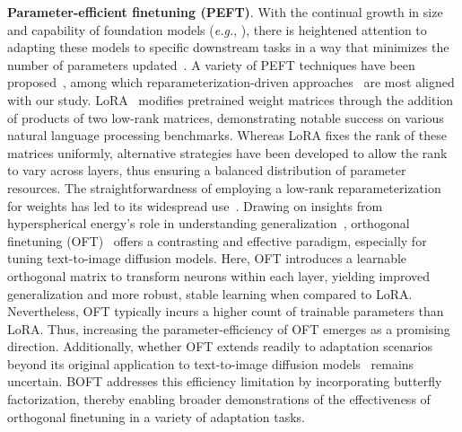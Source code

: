 \textbf{Parameter-efficient finetuning (PEFT)}. With the continual growth in size and capability of foundation models (\emph{e.g.}, \cite{brown2020language,radford2021learning,rombach2022high,kirillov2023segment}), there is heightened attention to adapting these models to specific downstream tasks in a way that minimizes the number of parameters updated~\cite{treviso2023efficient,ding2023parameter,lialin2023scaling}. A variety of PEFT techniques have been proposed~\cite{houlsby2019parameter,aghajanyan2020intrinsic,hulora2022,edalati2022krona,wang2022adamix,gheini2021cross,zaken2022bitfit,guo2020parameter,sung2021training,ansell2022composable,lester2021power,li2021prefix,vu2022spot,he2021towards,mao2021unipelt,karimi2021compacter,liu2022few,sung2022lst,chen2022parameter,jia2022visual,chen2022adaptformer,zhang2022neural,jie2023fact,lian2022scaling,luo2023towards}, among which reparameterization-driven approaches~\cite{aghajanyan2020intrinsic,hulora2022,edalati2022krona} are most aligned with our study. LoRA~\cite{hulora2022} modifies pretrained weight matrices through the addition of products of two low-rank matrices, demonstrating notable success on various natural language processing benchmarks. Whereas LoRA fixes the rank of these matrices uniformly, alternative strategies \cite{zhang2022adaptive,valipour2022dylora,zhang2023increlora} have been developed to allow the rank to vary across layers, thus ensuring a balanced distribution of parameter resources. The straightforwardness of employing a low-rank reparameterization for weights has led to its widespread use~\cite{dettmers2023qlora,zi2023delta,chavan2023one}. Drawing on insights from hyperspherical energy’s role in understanding generalization~\cite{liu2018learning,liu2021orthogonal}, orthogonal finetuning (OFT)~\cite{qiu2023controlling} offers a contrasting and effective paradigm, especially for tuning text-to-image diffusion models. Here, OFT introduces a learnable orthogonal matrix to transform neurons within each layer, yielding improved generalization and more robust, stable learning when compared to LoRA. Nevertheless, OFT typically incurs a higher count of trainable parameters than LoRA. Thus, increasing the parameter-efficiency of OFT emerges as a promising direction. Additionally, whether OFT extends readily to adaptation scenarios beyond its original application to text-to-image diffusion models~\cite{qiu2023controlling} remains uncertain. BOFT addresses this efficiency limitation by incorporating butterfly factorization, thereby enabling broader demonstrations of the effectiveness of orthogonal finetuning in a variety of adaptation tasks.

